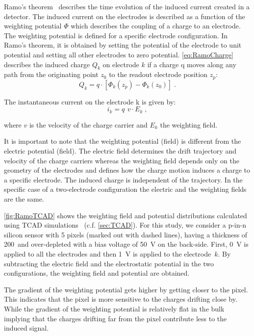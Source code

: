 Ramo's theorem~\cite{Ramo:1939vr} describes the time evolution of the
induced current created in a detector. The induced current on the
electrodes is described as a function of the weighting potential
$\Phi$ which describes the coupling of a charge to an electrode. The
weighting potential is defined for a specific electrode
configuration. In Ramo's theorem, it is obtained by setting the
potential of the electrode to unit potential and setting all other
electrodes to zero potential. \cref{eq:RamoCharge} describes the
induced charge $Q_k$ on electrode $k$ if a charge q moves along any
path from the originating point $z_0$ to the readout electrode
position $z_p$:
\begin{equation}
    Q_{k}=q \cdot [\Phi_k(z_p)-\Phi_k(z_0)] \; .
   \label{eq:RamoCharge} 
  \end{equation}

The instantaneous current on the electrode k is given by: 
\begin{equation}
    i_{k}=q \,\ v \cdot E_k \; ,
   \label{eq:RamoCurrent} 
  \end{equation}

  where $v$ is the velocity of the charge carrier and $E_k$ the
  weighting field.

  It is important to note that the weighting potential (field) is
  different from the electric potential (field). The electric field
  determines the drift trajectory and velocity of the charge carriers
  whereas the weighting field depends only on the geometry of the
  electrodes and defines how the charge motion induces a charge to a
  specific electrode. The induced charge is independent of the
  trajectory. In the specific case of a two-electrode configuration
  the electric and the weighting fields are the same.


  \cref{fig:RamoTCAD} shows the weighting field and potential
  distributions calculated using TCAD simulations~\cite{synopsysTCAD}
  (c.f. \cref{sec:TCAD}). For this study, we consider a p-in-n silicon
  sensor with 5 pixels (marked out with dashed lines), having a
  thickness of 200~\micron and over-depleted with a bias voltage of
  \SI{50}{\volt} on the back-side. First, \SI{0}{\volt} is applied to
  all the electrodes and then \SI{1}{\volt} is applied to the
  electrode~$k$. By subtracting the electric field and the
  electrostatic potential in the two configurations, the weighting
  field and potential are obtained.

  The gradient of the weighting potential gets higher by getting
  closer to the pixel. This indicates that the pixel is more sensitive
  to the charges drifting close by. While the gradient of the
  weighting potential is relatively flat in the bulk implying that the
  charges drifting far from the pixel contribute less to the induced
  signal.


